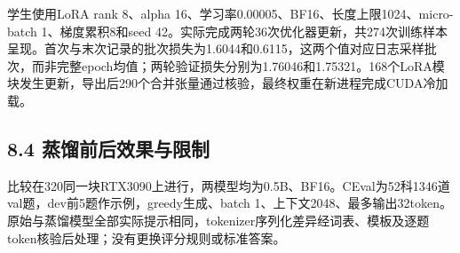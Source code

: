 \documentclass[UTF8,fontset=fandol,a4paper,11pt]{ctexart}
\begin{document}
学生使用LoRA rank 8、alpha
16、学习率0.00005、BF16、长度上限1024、micro-batch 1、梯度累积8和seed
42。实际完成两轮36次优化器更新，共274次训练样本呈现。首次与末次记录的批次损失为1.6044和0.6115，这两个值对应日志采样批次，而非完整epoch均值；两轮验证损失分别为1.76046和1.75321。168个LoRA模块发生更新，导出后290个合并张量通过核验，最终权重在新进程完成CUDA冷加载。

\subsection{8.4 蒸馏前后效果与限制}\label{ux84b8ux998fux524dux540eux6548ux679cux4e0eux9650ux5236}

比较在320同一块RTX3090上进行，两模型均为0.5B、BF16。CEval为52科1346道val题，dev前5题作示例，greedy生成、batch
1、上下文2048、最多输出32token。原始与蒸馏模型全部实际提示相同，tokenizer序列化差异经词表、模板及逐题token核验后处理；没有更换评分规则或标准答案。

\Needspace{135pt}
\end{document}
